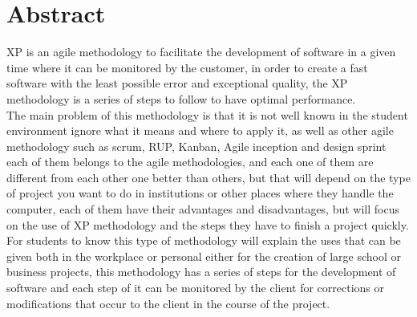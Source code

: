 \documentclass[letterpaper,oneside,openany,11pt]{book}
\begin{document}
\chapter*{Abstract} %
\noindent XP is an agile methodology to facilitate the development of software in a given time where it can be monitored by the customer, in order to create a fast software with the least possible error and exceptional quality, the XP methodology is a series of steps to follow to have optimal performance.\\

The main problem of this methodology is that it is not well known in the student environment ignore what it means and where to apply it, as well as other agile methodology such as scrum, RUP, Kanban, Agile inception and design sprint each of them belongs to the agile methodologies, and each one of them are different from each other one better than others, but that will depend on the type of project you want to do in institutions or other places where they handle the computer, each of them have their advantages and disadvantages, but will focus on the use of XP methodology and the steps they have to finish a project quickly.\\

For students to know this type of methodology will explain the uses that can be given both in the workplace or personal either for the creation of large school or business projects, this methodology has a series of steps for the development of software and each step of it can be monitored by the client for corrections or modifications that occur to the client in the course of the project.\\

\newpage
\tableofcontents %

\cleardoublepage
{} %
\listoffigures %

\cleardoublepage
{} %
\listoftables %


\end{document}
